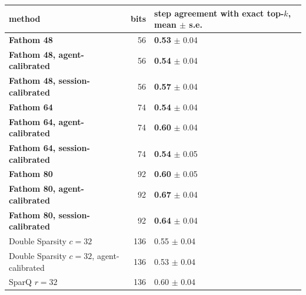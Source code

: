 \begin{tabular}{lrl}
\toprule
method & bits & step agreement with exact top-$k$, mean $\pm$ s.e. \\
\midrule
\textbf{Fathom 48} & 56 & \textbf{0.53} $\pm$ 0.04 \\
\textbf{Fathom 48, agent-calibrated} & 56 & \textbf{0.54} $\pm$ 0.04 \\
\textbf{Fathom 48, session-calibrated} & 56 & \textbf{0.57} $\pm$ 0.04 \\
\textbf{Fathom 64} & 74 & \textbf{0.54} $\pm$ 0.04 \\
\textbf{Fathom 64, agent-calibrated} & 74 & \textbf{0.60} $\pm$ 0.04 \\
\textbf{Fathom 64, session-calibrated} & 74 & \textbf{0.54} $\pm$ 0.05 \\
\textbf{Fathom 80} & 92 & \textbf{0.60} $\pm$ 0.05 \\
\textbf{Fathom 80, agent-calibrated} & 92 & \textbf{0.67} $\pm$ 0.04 \\
\textbf{Fathom 80, session-calibrated} & 92 & \textbf{0.64} $\pm$ 0.04 \\
Double Sparsity $c{=}32$ & 136 & 0.55 $\pm$ 0.04 \\
Double Sparsity $c{=}32$, agent-calibrated & 136 & 0.53 $\pm$ 0.04 \\
SparQ $r{=}32$ & 136 & 0.60 $\pm$ 0.04 \\
\bottomrule
\end{tabular}